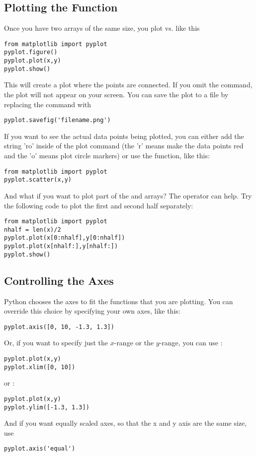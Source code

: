\subsection*{Plotting the Function}
Once you have two arrays of the same size, you plot  vs.
 like this
\begin{Verbatim}
from matplotlib import pyplot
pyplot.figure()
pyplot.plot(x,y)
pyplot.show()
\end{Verbatim}
This will create a plot where the points are connected.  If you omit
the  command, the plot will not appear on your
screen.  You can save the plot to a file by replacing the
  command with
\begin{Verbatim}
pyplot.savefig('filename.png')
\end{Verbatim}
If you want to see the actual data points being plotted, you
can either add the string 'ro' inside of the plot command (the 'r'
means make the data points red and the 'o' means plot circle markers) or use the
 function, like this:
\begin{Verbatim}
from matplotlib import pyplot
pyplot.scatter(x,y)
\end{Verbatim}

 And what if you want to plot part
of the  and  arrays? The  operator can
help.  Try the following code to plot the first and second half
separately:
\begin{Verbatim}
from matplotlib import pyplot
nhalf = len(x)/2
pyplot.plot(x[0:nhalf],y[0:nhalf])
pyplot.plot(x[nhalf:],y[nhalf:])
pyplot.show()
\end{Verbatim}

\subsection*{Controlling the Axes}
\label{sec:Axes}
 Python chooses the axes to fit the functions
that you are plotting. You can override this choice by specifying
your own axes, like this:
\begin{Verbatim}
pyplot.axis([0, 10, -1.3, 1.3])
\end{Verbatim}
  Or, if you want to specify just the
$x$-range or the $y$-range, you can use :
\begin{Verbatim}
pyplot.plot(x,y)
pyplot.xlim([0, 10])
\end{Verbatim}
or :
\begin{Verbatim}
pyplot.plot(x,y)
pyplot.ylim([-1.3, 1.3])
\end{Verbatim}
And if you want equally scaled axes, so that the x and y axis are the same size, use
\begin{Verbatim}
pyplot.axis('equal')
\end{Verbatim}
 


